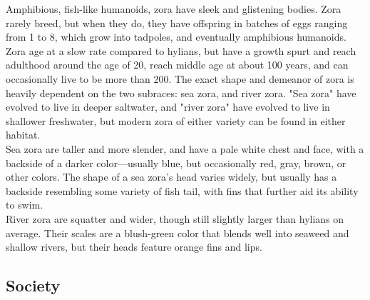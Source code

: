 \documentclass[10pt,twoside,twocolumn,openany]{book}
\begin{document}
Amphibious, fish-like humanoids, zora have sleek and glistening bodies. Zora rarely breed, but when they do, they have offspring in batches of eggs ranging from 1 to 8, which grow into tadpoles, and eventually amphibious humanoids. Zora age at a slow rate compared to hylians, but have a growth spurt and reach adulthood around the age of 20, reach middle age at about 100 years, and can occasionally live to be more than 200.
The exact shape and demeanor of zora is heavily dependent on the two subraces: sea zora, and river zora. "Sea zora" have evolved to live in deeper saltwater, and "river zora" have evolved to live in shallower freshwater, but modern zora of either variety can be found in either habitat.\\
Sea zora are taller and more slender, and have a pale white chest and face, with a backside of a darker color—usually blue, but occasionally red, gray, brown, or other colors. The shape of a sea zora's head varies widely, but usually has a backside resembling some variety of fish tail, with fins that further aid its ability to swim.\\
River zora are squatter and wider, though still slightly larger than hylians on average. Their scales are a blush-green color that blends well into seaweed and shallow rivers, but their heads feature orange fins and lips.

\subsection{Society}
\end{document}
